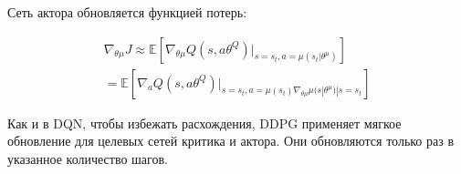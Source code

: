 Сеть актора обновляется функцией потерь:

\begin{equation}
	\label{eq:ch1-ddpg-4}
	\begin{multlined}
		\nabla_{\theta \mu} J \approx \mathbb{E}[\nabla_{\theta \mu} Q(s, a \theta^Q)|_{s=s_t,a=\mu(s_t|\theta^\mu)}] \\
		= \mathbb{E}[\nabla_a Q(s, a \theta^Q)|_{s=s_t,a=\mu(s_t) \nabla_{\theta \mu} \mu (s|\theta^\mu)|s=s_t}]
	\end{multlined}
\end{equation}

Как и в DQN, чтобы избежать расхождения, DDPG применяет мягкое обновление для целевых сетей критика и актора. Они обновляются только раз в указанное количество шагов.
